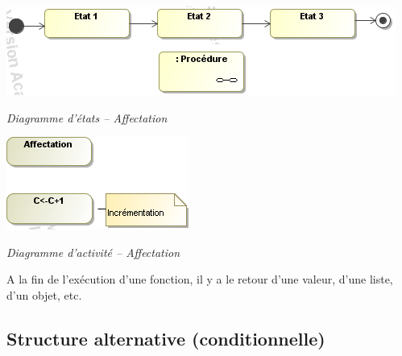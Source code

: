 \documentclass[10pt]{article}
\begin{document}
\begin{minipage}[c]{.48\linewidth}
\begin{center}
\includegraphics[width=\textwidth]{images/Fonctions_stm}

\textit{Diagramme d'états -- Affectation}
\end{center}
\end{minipage} \hfill
\begin{minipage}[c]{.48\linewidth}
\begin{center}
\includegraphics[width=.7\textwidth]{images/Affectation_act}

\textit{Diagramme d'activité -- Affectation}
\end{center}
\end{minipage}


A la fin de l’exécution d’une fonction, il y a le retour d’une valeur, d’une liste, d’un objet, etc.
\subsection{Structure alternative (conditionnelle)}
\end{document}
